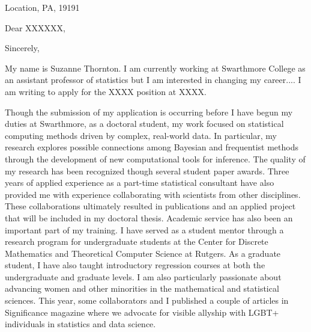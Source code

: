 \documentclass[11pt,a4paper,sans]{moderncv}
\begin{document}
	
	{Location, PA, 19191}
	\date{\today }
	\opening{Dear XXXXXX,}
	\closing{Sincerely,}
	\makelettertitle
	
	
	
	
	
	My name is Suzanne Thornton. I am currently working at Swarthmore College as an assistant professor of statistics but I am interested in changing my career.... I am writing to apply for the XXXX position at XXXX.\\ \vspace{.5cm}
	
	Though the submission of my application is occurring before I have begun my duties at Swarthmore, as a doctoral student, my work focused on statistical computing methods driven by complex, real-world data. In particular, my research explores possible connections among Bayesian and frequentist methods through the development of new computational tools for inference. The quality of my research has been recognized though several student paper awards. Three years of applied experience as a part-time statistical consultant have also provided me with experience collaborating with scientists from other disciplines. These collaborations ultimately resulted in publications and an applied project that will be included in my doctoral thesis. Academic service has also been an important part of my training. I have served as a student mentor through a research program for undergraduate students at the Center for Discrete Mathematics and Theoretical Computer Science at Rutgers. As a graduate student, I have also taught introductory regression courses at both the undergraduate and graduate levels. I am also particularly passionate about advancing women and other minorities in the mathematical and statistical sciences. This year, some collaborators and I published a couple of articles in Significance magazine where we advocate for visible allyship with LGBT+ individuals in statistics and data science.
	\vspace{.5cm} 
	
\end{document}
